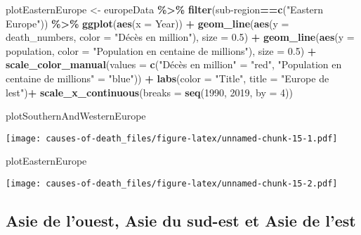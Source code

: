 \documentclass[
]{article}
\newenvironment{Shaded}{\begin{snugshade}}{\end{snugshade}}
\newcommand{\AttributeTok}[1]{\textcolor[rgb]{0.13,0.29,0.53}{#1}}
\newcommand{\DecValTok}[1]{\textcolor[rgb]{0.00,0.00,0.81}{#1}}
\newcommand{\FloatTok}[1]{\textcolor[rgb]{0.00,0.00,0.81}{#1}}
\newcommand{\FunctionTok}[1]{\textcolor[rgb]{0.13,0.29,0.53}{\textbf{#1}}}
\newcommand{\NormalTok}[1]{#1}
\newcommand{\OtherTok}[1]{\textcolor[rgb]{0.56,0.35,0.01}{#1}}
\newcommand{\SpecialCharTok}[1]{\textcolor[rgb]{0.81,0.36,0.00}{\textbf{#1}}}
\newcommand{\StringTok}[1]{\textcolor[rgb]{0.31,0.60,0.02}{#1}}
\begin{document}
\begin{Shaded}
\begin{Highlighting}[]
\NormalTok{plotEasternEurope }\OtherTok{\textless{}{-}}\NormalTok{ europeData }\SpecialCharTok{\%\textgreater{}\%}
  \FunctionTok{filter}\NormalTok{(}\StringTok{\textasciigrave{}}\AttributeTok{sub{-}region}\StringTok{\textasciigrave{}}\SpecialCharTok{==}\FunctionTok{c}\NormalTok{(}\StringTok{"Eastern Europe"}\NormalTok{)) }\SpecialCharTok{\%\textgreater{}\%}
  \FunctionTok{ggplot}\NormalTok{(}\FunctionTok{aes}\NormalTok{(}\AttributeTok{x =}\NormalTok{ Year)) }\SpecialCharTok{+} 
  \FunctionTok{geom\_line}\NormalTok{(}\FunctionTok{aes}\NormalTok{(}\AttributeTok{y =}\NormalTok{ death\_numbers, }\AttributeTok{color =} \StringTok{"Décès en million"}\NormalTok{), }\AttributeTok{size =} \FloatTok{0.5}\NormalTok{) }\SpecialCharTok{+}
  \FunctionTok{geom\_line}\NormalTok{(}\FunctionTok{aes}\NormalTok{(}\AttributeTok{y =}\NormalTok{ population, }\AttributeTok{color =} \StringTok{"Population en centaine de millions"}\NormalTok{), }\AttributeTok{size =} \FloatTok{0.5}\NormalTok{) }\SpecialCharTok{+}
  \FunctionTok{scale\_color\_manual}\NormalTok{(}\AttributeTok{values =} \FunctionTok{c}\NormalTok{(}\StringTok{"Décès en million"} \OtherTok{=} \StringTok{"red"}\NormalTok{, }\StringTok{"Population en centaine de millions"} \OtherTok{=} \StringTok{"blue"}\NormalTok{)) }\SpecialCharTok{+}
  \FunctionTok{labs}\NormalTok{(}\AttributeTok{color =} \StringTok{"Title"}\NormalTok{, }\AttributeTok{title =} \StringTok{"Europe de l\textquotesingle{}est"}\NormalTok{)}\SpecialCharTok{+}
  \FunctionTok{scale\_x\_continuous}\NormalTok{(}\AttributeTok{breaks =} \FunctionTok{seq}\NormalTok{(}\DecValTok{1990}\NormalTok{, }\DecValTok{2019}\NormalTok{, }\AttributeTok{by =} \DecValTok{4}\NormalTok{))}

\NormalTok{plotSouthernAndWesternEurope}
\end{Highlighting}
\end{Shaded}

\texttt{[image: causes-of-death\_files/figure-latex/unnamed-chunk-15-1.pdf]}

\begin{Shaded}
\begin{Highlighting}[]
\NormalTok{plotEasternEurope}
\end{Highlighting}
\end{Shaded}

\texttt{[image: causes-of-death\_files/figure-latex/unnamed-chunk-15-2.pdf]}

\hypertarget{asie-de-louest-asie-du-sud-est-et-asie-de-lest}{%
\subsection{Asie de l'ouest, Asie du sud-est et Asie de
l'est}\label{asie-de-louest-asie-du-sud-est-et-asie-de-lest}}
\end{document}

